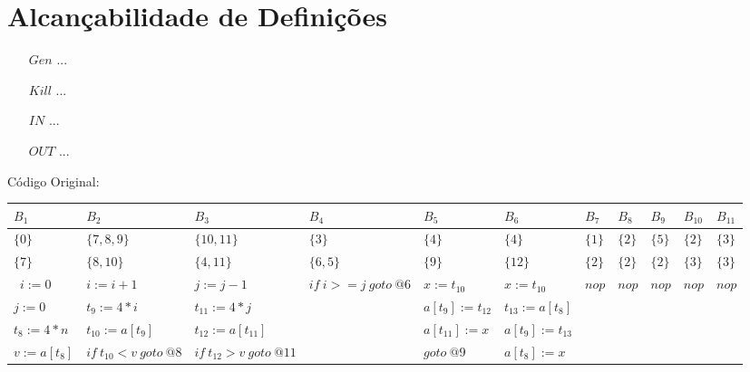 \section{Alcan\c{c}abilidade de Defini\c{c}\~oes}

\begin{itemize}
  \item[$Gen$] ...
  \item[$Kill$] ...
  \item[$IN$] ...
  \item[$OUT$] ...
\end{itemize}

C\'odigo Original:

\begin{table}[ht]
\begin{scriptsize}
\begin{tabular}{l|l|l|l|l|l|l|l|l|l|l}
$B_{1}$ & $B_{2}$ & $B_{3}$ & $B_{4}$ & $B_{5}$ & $B_{6}$ & $B_{7}$ & $B_{8}$ & $B_{9}$ & $B_{10}$ & $B_{11}$ \\
\hline
$\{0\}$ & $\{7, 8, 9\}$ & $\{10, 11\}$ & $\{3\}$ & $\{4\}$ & $\{4\}$ & $\{1\}$ & $\{2\}$ & $\{5\}$ & $\{2\}$ & $\{3\}$ \\
$\{7\}$ & $\{8, 10\}$ & $\{4, 11\}$ & $\{6, 5\}$ & $\{9\}$ & $\{12\}$ & $\{2\}$ & $\{2\}$ & $\{2\}$ & $\{3\}$ & $\{3\}$ \\
\hline\
$i:=0$ & $i:=i+1$ & $j:=j-1$ & $if\:i>=j\:goto\:@6$ & $x:=t_{10}$ & $x:=t_{10}$ & $nop$ & $nop$ & $nop$ & $nop$ & $nop$ \\
$j:=0$ & $t_{9}:=4*i$ & $t_{11}:=4*j$ &  & $a[t_{9}]:=t_{12}$ & $t_{13}:=a[t_{8}]$ &  &  &  &  &  \\
$t_{8}:=4*n$ & $t_{10}:=a[t_{9}]$ & $t_{12}:=a[t_{11}]$ &  & $a[t_{11}]:=x$ & $a[t_{9}]:=t_{13}$ &  &  &  &  &  \\
$v:=a[t_{8}]$ & $if\:t_{10}<v\:goto\:@8$ & $if\:t_{12}>v\:goto\:@11$ &  & $goto\:@9$ & $a[t_{8}]:=x$ &  &  &  &  &  \\
\end{tabular}
\end{scriptsize}
\end{table}

